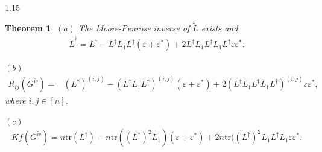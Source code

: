 \documentclass[preprint,12pt]{elsarticle1}
\newtheorem{thm}{Theorem}[section]
\numberwithin{equation}{section}
\begin{document}
\begin{spacing}{1.15}
\begin{thm}
$(a)$ The Moore-Penrose inverse of $\widetilde{L}$ exists and \begin{align}\label{eq1}
\widetilde{L}^{\dag}=L^{\dag}-
L^{\dag}L_{1}L^{\dag}(\varepsilon+\varepsilon^{*})
+2L^{\dag}L_{1}L^{\dag}L_{1}L^{\dag}
\varepsilon\varepsilon^{*}.
\end{align}


$(b)$
 \begin{align}\nonumber
R_{ij}(G^{\widetilde{w}})
=&(L^{\dag})^{(i,j)}-
(L^{\dag}L_{1}L^{\dag})^{(i,j)}(\varepsilon
+\varepsilon^{*})
+2(L^{\dag}L_{1}L^{\dag}L_{1}L^{\dag})^{(i,j)}\varepsilon\varepsilon^{*},
\end{align}
where $i,j\in[n]$.


$(c)$
\begin{align}\label{jia}
Kf(G^{\widetilde{w}})
=n\textrm{tr}(L^{\dag})
-n\textrm{tr}((L^{\dag})^{2}L_{1})
(\varepsilon+\varepsilon^{*})
+2n\textrm{tr}((L^{\dag})^{2}L_{1}L^{\dag}L_{1}\varepsilon\varepsilon^{*}.
\end{align}
\end{thm}


\end{spacing}
\end{document}
